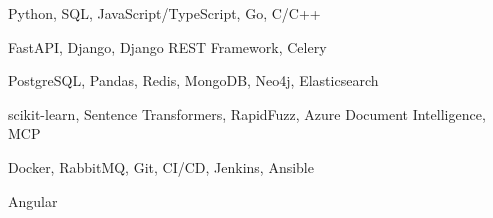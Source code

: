 %
%
%


\begin{keywords}
        {Python, SQL, JavaScript/TypeScript, Go, C/C++}

        {FastAPI, Django, Django REST Framework, Celery}

        {PostgreSQL, Pandas, Redis, MongoDB, Neo4j, Elasticsearch}

        {scikit-learn, Sentence Transformers, RapidFuzz, Azure Document Intelligence, MCP}

        {Docker, RabbitMQ, Git, CI/CD, Jenkins, Ansible}

        {Angular}

\end{keywords}